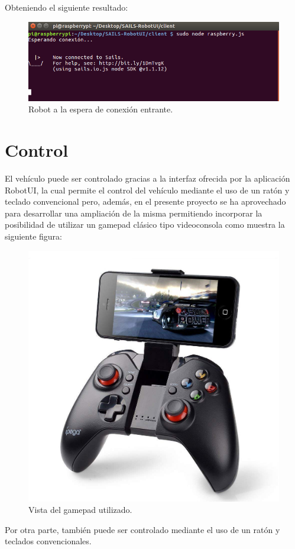 Obteniendo el siguiente resultado:

\begin{figure}[H]
  \begin{center}
    \includegraphics[scale=.6]{imagenes/manual-usuario/espera-conexion.png}
  \end{center}
  \caption{ Robot a la espera de conexión entrante.}
  \label{website:pagina-principal}
\end{figure}


\section{Control}

El vehículo puede ser controlado gracias a la interfaz ofrecida por la aplicación RobotUI, la cual permite el control del vehículo mediante el uso de un ratón y teclado convencional pero, además,
en el presente proyecto se ha aprovechado para desarrollar una ampliación de la misma permitiendo incorporar la posibilidad de utilizar un gamepad clásico tipo videoconsola como muestra la siguiente
figura:

\begin{figure}[H]
  \begin{center}
    \includegraphics[scale=0.2]{imagenes/robot/control_pad.jpg}
  \end{center}
  \caption{Vista del gamepad utilizado.}
  \label{figura:rpi-modulo-bateria}
\end{figure}


Por otra parte, también puede ser controlado mediante el uso de un ratón y teclados convencionales.\\
